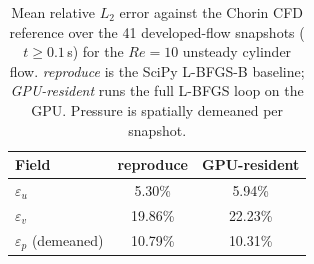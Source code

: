 \begin{table}[t]
  \centering
  \caption{Mean relative $L_2$ error against the Chorin CFD reference over the
           41 developed-flow snapshots ($t\ge 0.1$\,s) for the $Re=10$ unsteady
           cylinder flow. \emph{reproduce} is the SciPy L-BFGS-B
           baseline; \emph{GPU-resident} runs the full L-BFGS loop on the GPU.
           Pressure is spatially demeaned per snapshot.}
  \label{tab:l2_ref_vs_gpures}
  \begin{tabular}{lcc}
    \toprule
    Field & reproduce & GPU-resident \\
    \midrule
    $\varepsilon_u$            & 5.30\%  & 5.94\%  \\
    $\varepsilon_v$            & 19.86\% & 22.23\% \\
    $\varepsilon_p$ (demeaned) & 10.79\% & 10.31\% \\
    \bottomrule
  \end{tabular}
\end{table}
